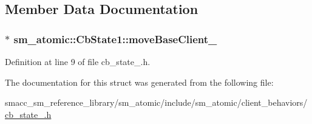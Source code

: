 \subsection{Member Data Documentation}
\subsubsection[{\texorpdfstring{move\+Base\+Client\+\_\+}{moveBaseClient_}}]{$\ast$ sm\+\_\+atomic\+::\+Cb\+State1\+::move\+Base\+Client\+\_\+}\hypertarget{structsm__atomic_1_1CbState1_a8b4b01655654c03cd1f01ad7cf3feb02}{}\label{structsm__atomic_1_1CbState1_a8b4b01655654c03cd1f01ad7cf3feb02}


Definition at line 9 of file cb\+\_\+state\+\_.\+h.



The documentation for this struct was generated from the following file\+:\begin{DoxyCompactItemize}
\item 
smacc\+\_\+sm\+\_\+reference\+\_\+library/sm\+\_\+atomic/include/sm\+\_\+atomic/client\+\_\+behaviors/\hyperlink{cb__state__1_8h}{cb\+\_\+state\+\_.\+h}\end{DoxyCompactItemize}
